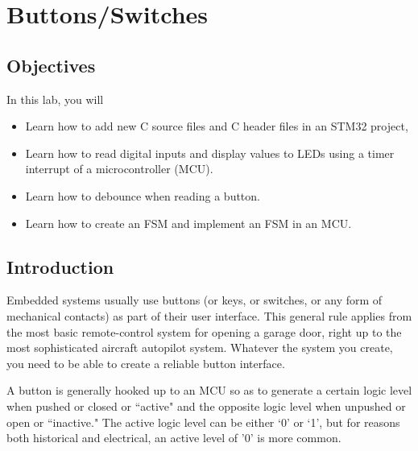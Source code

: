 \section{Buttons/Switches}


\subsection{Objectives}
In this lab, you will
\begin{itemize}
    \item Learn how to add new C source files and C header files in an STM32 project, 
    \item Learn how to read digital inputs and display values to LEDs using a timer interrupt of a microcontroller (MCU). 
    \item Learn how to debounce when reading a button.
    \item Learn how to create an FSM and implement an FSM in an MCU.
\end{itemize}

\subsection{Introduction}
Embedded systems usually use buttons (or keys, or switches, or any form of mechanical contacts) as part of their user interface. This general rule applies from the most basic remote-control system for opening a garage door, right up to the most sophisticated aircraft autopilot system. Whatever the system you create, you need to be able to create a reliable button interface. 


A button is generally hooked up to an MCU so as to generate a certain logic level when pushed or closed or ``active" and the opposite logic level when unpushed or open or ``inactive."  The active logic level can be either `0' or `1', but for reasons both historical and electrical, an active level of '0' is more common.

